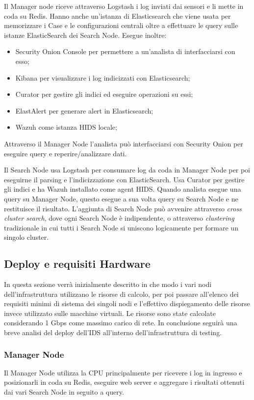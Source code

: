 \vspace{5mm}
Il Manager node riceve attraverso Logstash i log  inviati dai sensori e li mette in coda su Redis.
Hanno anche un'istanza di Elasticsearch che viene usata per memorizzare i Case e le configurazioni centrali oltre a effettuare le query sulle istanze ElasticSearch dei Search Node.
Esegue inoltre:
\begin{itemize}
    \item Security Onion Console per permettere a un'analista di interfacciarsi con esso;
    \item Kibana per visualizzare  i log indicizzati con Elasticsearch;
    \item Curator per gestire gli indici ed eseguire operazioni su essi;
    \item ElastAlert per generare alert  in Elasticsearch;
    \item Wazuh come istanza HIDS locale;
\end{itemize}
Attraverso il Manager Node l'analista può interfacciarsi con Security Onion per eseguire query e reperire/analizzare dati.

\vspace{5mm}
Il Search Node usa Logstash per consumare log da coda in Manager Node per poi eseguirne il parsing e l'indicizzazione con ElasticSearch. Usa Curator per gestire gli indici e ha Wazuh installato come agent HIDS. Quando analista esegue una query su Manager Node, questo esegue a sua volta query su Search Node e ne restituisce il risultato.
L'aggiunta di Search Node può avvenire attraverso \textit{cross cluster search}, dove ogni Search Node è indipendente, o attraverso \textit{clustering} tradizionale in cui tutti i Search Node si uniscono logicamente per formare un singolo cluster.

\subsection{Deploy e requisiti Hardware}
In questa sezione verrà inizialmente descritto in che modo i vari nodi dell'infrastruttura utilizzano le risorse di calcolo, per poi passare all'elenco dei requisiti minimi di sistema \cite{securityOnionRequirements} dei singoli nodi e l'effettivo dispiegamento delle risorse invece utilizzato sulle macchine virtuali.
Le risorse sono state calcolate considerando 1 Gbps come massimo carico di rete.
In conclusione seguirà una breve analisi del  deploy dell'IDS all'interno dell'infrastruttura di testing.


\subsubsection*{Manager Node}
Il Manager Node utilizza la CPU principalmente per ricevere i log in ingresso e posizionarli in coda su Redis, eseguire web server e aggregare i risultati ottenuti dai vari Search Node in seguito a query. 

